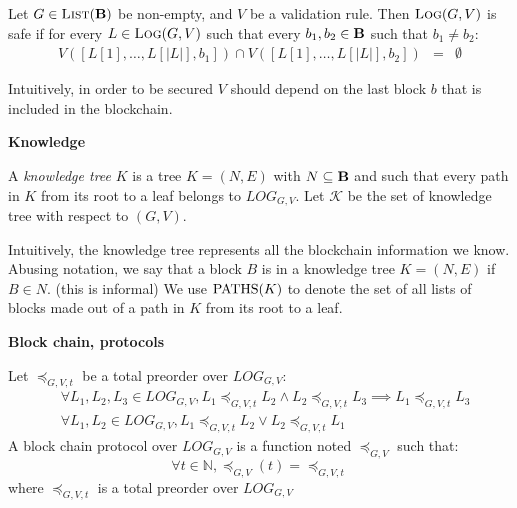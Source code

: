 %
%

\begin{mydef}
Let $G \in \text{\sc List}(\text{\bf B})$ be non-empty, and $V$ be a validation rule. Then $\text{\sc Log}(G,V)$ is safe if for every $L \in \text{\sc Log}(G,V)$ such that every $b_1, b_2 \in \text{\bf B}$ such that $b_1 \neq b_2$:
\begin{eqnarray*}
V([L[1], \ldots, L[|L|], b_1]) \cap V([L[1], \ldots, L[|L|], b_2]) & = & \emptyset
\end{eqnarray*}
\end{mydef}
Intuitively, in order to be secured $V$ should depend on the last block $b$ that is included in the blockchain.

\medskip
\noindent
\textbf{Knowledge}

\begin{mydef}
A \emph{knowledge tree} $K$ is a tree $K = (N,E)$ with $N \subseteq \text{\bf B}$ and such that 
every path in $K$ from its root to a leaf belongs to $LOG_{G,V}$.
Let $\mathcal{K}$ be the set of knowledge tree with respect to $(G,V)$.
\end{mydef}

Intuitively, the knowledge tree represents all the blockchain information we know. 
Abusing notation, we say that a block $B$ is in a knowledge tree $K = (N,E)$ if $B \in N$. 
(this is informal) We use $\text{PATHS}(K)$ to denote the set of all lists of blocks made out of a path 
in $K$ from its root to a leaf. 


\medskip
\noindent
\textbf{Block chain, protocols}

\begin{mydef}
	Let $\preceq_{G,V,t}$ be  a total preorder over $LOG_{G,V}$:
\begin{eqnarray*}		
	&\forall L_1, L_2, L_3 \in LOG_{G,V}, L_1 \preceq_{G,V,t} L_2 \land L_2 \preceq_{G,V,t} L_3 \implies L_1 \preceq_{G,V,t} L_3  \\
	&\forall L_1, L_2 \in LOG_{G,V}, L_1 \preceq_{G,V,t} L_2 \lor L_2 \preceq_{G,V,t} L_1 
\end{eqnarray*}
	A block chain protocol over $LOG_{G,V}$ is a function noted $\preceq_{G,V}$ such that: $$ \forall t \in \mathbb{N}, \preceq_{G,V}(t) =  \preceq_{G,V,t}$$ where $\preceq_{G,V,t}$ is a total preorder over $LOG_{G,V}$
\end{mydef}

